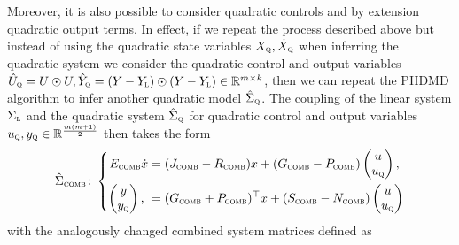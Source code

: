 Moreover, it is also possible to consider quadratic controls and by extension quadratic output terms.
In effect, if we repeat the process described above but instead of using the quadratic state variables $X_{\textnormal{\scshape q}}, \dot{X}_{\textnormal{\scshape q}}$ when inferring the quadratic system we consider the quadratic control and output variables $\hat{U}_{\textnormal{\scshape q}} = U \odot U, \hat{Y}_{\textnormal{\scshape q}} = (Y - Y_{\textnormal{\scshape l}}) \odot (Y - Y_{\textnormal{\scshape l}}) \in \mathbb{R}^{m \times k}$, then we can repeat the \ac{PHDMD} algorithm to infer another quadratic model $\hat{\Sigma}_{\textnormal{\scshape q}}$.
The coupling of the linear system $\Sigma_{\textnormal{\scshape l}}$ and the quadratic system $\hat{\Sigma}_{\textnormal{\scshape q}}$ for quadratic control and output variables $u_{\textnormal{\scshape q}}, y_{\textnormal{\scshape q}} \in \mathbb{R}^{\frac{m (m + 1)}{2}}$ then takes the form
\begin{equation}\label{eq:quad-io-system-coupling}
    \hat{\Sigma}_{\textnormal{\scshape comb}} \colon \left\lbrace
    \begin{aligned}
        E_{\textnormal{\scshape comb}} \dot{x} &= (J_{\textnormal{\scshape comb}} - R_{\textnormal{\scshape comb}}) x + (G_{\textnormal{\scshape comb}} - P_{\textnormal{\scshape comb}}) \begin{pmatrix}
            u \\
            u_{\textnormal{\scshape q}}
        \end{pmatrix}, \\
        \begin{pmatrix}
            y \\
            y_{\textnormal{\scshape q}}
        \end{pmatrix}, \ &= (G_{\textnormal{\scshape comb}} + P_{\textnormal{\scshape comb}})^{\top} x + (S_{\textnormal{\scshape comb}} - N_{\textnormal{\scshape comb}}) \begin{pmatrix}
            u \\
            u_{\textnormal{\scshape q}}
        \end{pmatrix}
    \end{aligned}
    \right.
\end{equation}
with the analogously changed combined system matrices defined as
